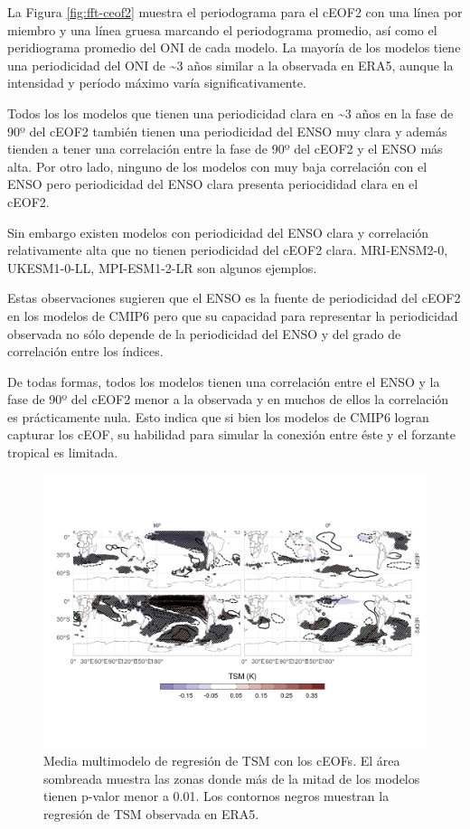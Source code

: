 \documentclass[12pt,oneside]{reedthesis}
\begin{document}
La Figura \ref{fig:fft-ceof2} muestra el periodograma para el cEOF2 con una línea por miembro y una línea gruesa marcando el periodograma promedio, así como el peridiograma promedio del ONI de cada modelo.
La mayoría de los modelos tiene una periodicidad del ONI de \textasciitilde3 años similar a la observada en ERA5, aunque la intensidad y período máximo varía significativamente.

Todos los los modelos que tienen una periodicidad clara en \textasciitilde3 años en la fase de 90º del cEOF2 también tienen una periodicidad del ENSO muy clara y además tienden a tener una correlación entre la fase de 90º del cEOF2 y el ENSO más alta.
Por otro lado, ninguno de los modelos con muy baja correlación con el ENSO pero periodicidad del ENSO clara presenta periocididad clara en el cEOF2.

Sin embargo existen modelos con periodicidad del ENSO clara y correlación relativamente alta que no tienen periodicidad del cEOF2 clara.
MRI-ENSM2-0, UKESM1-0-LL, MPI-ESM1-2-LR son algunos ejemplos.

Estas observaciones sugieren que el ENSO es la fuente de periodicidad del cEOF2 en los modelos de CMIP6 pero que su capacidad para representar la periodicidad observada no sólo depende de la periodicidad del ENSO y del grado de correlación entre los índices.

De todas formas, todos los modelos tienen una correlación entre el ENSO y la fase de 90º del cEOF2 menor a la observada y en muchos de ellos la correlación es prácticamente nula.
Esto indica que si bien los modelos de CMIP6 logran capturar los cEOF, su habilidad para simular la conexión entre éste y el forzante tropical es limitada.



\begin{figure}
\includegraphics{figures/50-cmip6/sst-mmm-1} \caption{Media multimodelo de regresión de TSM con los cEOFs. El área sombreada muestra las zonas donde más de la mitad de los modelos tienen p-valor menor a 0.01. Los contornos negros muestran la regresión de TSM observada en ERA5.}\label{fig:sst-mmm}
\end{figure}
\end{document}

